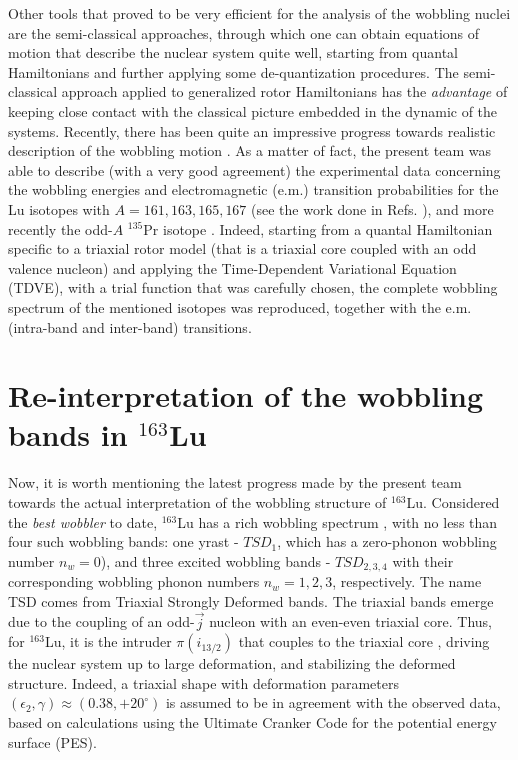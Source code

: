 \documentclass[11pt]{article}
\begin{document}
Other tools that proved to be very efficient for the analysis of the wobbling nuclei are the semi-classical approaches, through which one can obtain equations of motion that describe the nuclear system quite well, starting from quantal Hamiltonians and further applying some de-quantization procedures. The semi-classical approach applied to generalized rotor Hamiltonians has the \emph{advantage} of keeping close contact with the classical picture embedded in the dynamic of the systems. Recently, there has been quite an impressive progress towards realistic description of the wobbling motion \cite{raduta2007semiclassical,frauendorf2014transverse,raduta2017semiclassical,raduta2018wobbling,budaca2018tilted,raduta2020approach,raduta2020towards}. As a matter of fact, the present team was able to describe (with a very good agreement) the experimental data concerning the wobbling energies and electromagnetic (e.m.) transition probabilities for the Lu isotopes with $A=161,163,165,167$ (see the work done in Refs. \cite{raduta2017semiclassical,raduta2018wobbling}), and more recently the odd-$A$ $^{135}$Pr isotope \cite{raduta2020new}. Indeed, starting from a quantal Hamiltonian specific to a triaxial rotor model (that is a triaxial core coupled with an odd valence nucleon) and applying the Time-Dependent Variational Equation (TDVE), with a trial function that was carefully chosen, the complete wobbling spectrum of the mentioned isotopes was reproduced, together with the e.m. (intra-band and inter-band) transitions.

\section{\texorpdfstring{Re-interpretation of the wobbling bands in $^{163}$Lu}%
                               {Re-interpretation of the wobbling bands structure for 163Lu}}

Now, it is worth mentioning the latest progress made by the present team towards the actual interpretation of the wobbling structure of $^{163}$Lu. Considered the \emph{best wobbler} to date, $^{163}$Lu has a rich wobbling spectrum \cite{odegaard2001evidence,jensen2002evidence}, with no less than four such wobbling bands: one yrast - $TSD_1$, which has a zero-phonon wobbling number $n_w=0$), and three excited wobbling bands - $TSD_{2,3,4}$ with their corresponding wobbling phonon numbers $n_w=1,2,3$, respectively. The name TSD comes from Triaxial Strongly Deformed bands. The triaxial bands emerge due to the coupling of an odd-$\vec{j}$ nucleon with an even-even triaxial core. Thus, for $^{163}$Lu, it is the intruder $\pi(i_{13/2})$ that couples to the triaxial core \cite{odegaard2001evidence,hamamoto2002wobbling,jensen2002wobbling}, driving the nuclear system up to large deformation, and stabilizing the deformed structure. Indeed, a triaxial shape with deformation parameters $(\epsilon_2,\gamma)\approx(0.38,+20^\circ)$ is assumed to be in agreement with the observed data, based on calculations using the Ultimate Cranker Code \cite{bengtsson1990high} for the potential energy surface (PES).
\end{document}
